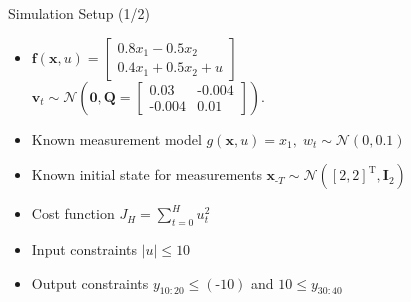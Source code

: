 \documentclass[student, noshadow, itr, english, aspectratio=169]{ITR_LSR_slides}
\begin{document}
\begin{frame}{Simulation Setup (1/2)}
\begin{itemize}
\item 
{}
$\boldsymbol{f}(\boldsymbol{x}, u) = 
\begin{bmatrix}
0.8  x_1 - 0.5 x_2 \\
0.4 x_1 + 0.5 x_2 + u
\end{bmatrix}$ \\
\makebox[4cm]{\hfill} $\boldsymbol{v}_t \sim \mathcal{N} \left(\boldsymbol{0}, \boldsymbol{Q} =  
\begin{bmatrix}
0.03 & \text{-}0.004 \\
\text{-}0.004 & 0.01
\end{bmatrix}
\right).$

\item Known measurement model $g(\boldsymbol{x}, u) = x_1, \; w_t \sim \mathcal{N} (0, 0.1)$

\item Known initial state for measurements $\boldsymbol{x}_{\text{-}T} \sim \mathcal{N} ([2, 2]^\text{T}, \boldsymbol{I}_2)$ 

\item Cost function $J_H = \sum_{t = 0}^H u_t^2$

\item Input constraints $\left| u \right| \leq 10$

\item Output constraints $y_{10:20} \leq (\text{-} 10)$ and $10 \leq y_{30:40}$
\end{itemize}
\end{frame}
\end{document}
